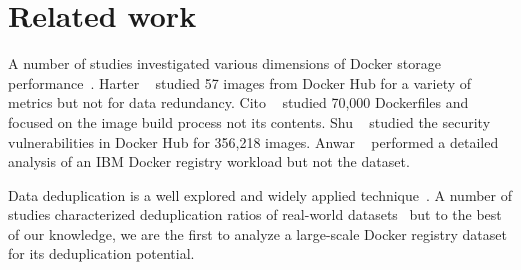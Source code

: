 \section{Related work}
\label{sec:related}


A number of studies investigated various dimensions of Docker storage
performance~\cite{dockerssd,shifter,slacker,exoclones,docker-driver-eval,
improve-cow-container-drivers}.
%
Harter \etal~\cite{slacker} studied 57 images from Docker Hub for a variety of metrics
but not for data redundancy.
%
Cito \etal~\cite{analysisdockergithub} studied 70,000
Dockerfiles and focused on the image build process not its contents.
%
Shu \etal~\cite{dockervulnerabile} studied the security vulnerabilities in Docker Hub
for 356,218 images.
%
Anwar \etal~\cite{dockerworkload} performed a detailed analysis
of an IBM Docker registry workload but not the dataset.

%
%
%

Data deduplication is a well
explored and widely applied technique~\cite{2009-sparse_indexing_inline_dedup_using_sampling-fast,
2001-low_bandwidth_network_fs-sosp,
2012-idedup-fast,
tarasov2014dmdedup,
2008-avoid_disk_bottleneck_data_domain_dedupfs-fast}.
%
A number of studies characterized deduplication ratios of
real-world datasets~\cite{2009-dedup_effectiveness_on_vm_disk_images-systor,
2012-data_reduction_in_primary_storage-systor,
2012-hpc_practical_dedup_study-sc,
2013-charact_increment_changes_data_protect-atc,
msst16dedup-study,
2012-charact_backup_workloads-fast,
2013-charact_dedup_effic_big_data-iiswc}
but to the best of our knowledge, we are the first to analyze a large-scale Docker
registry dataset for its deduplication potential.


